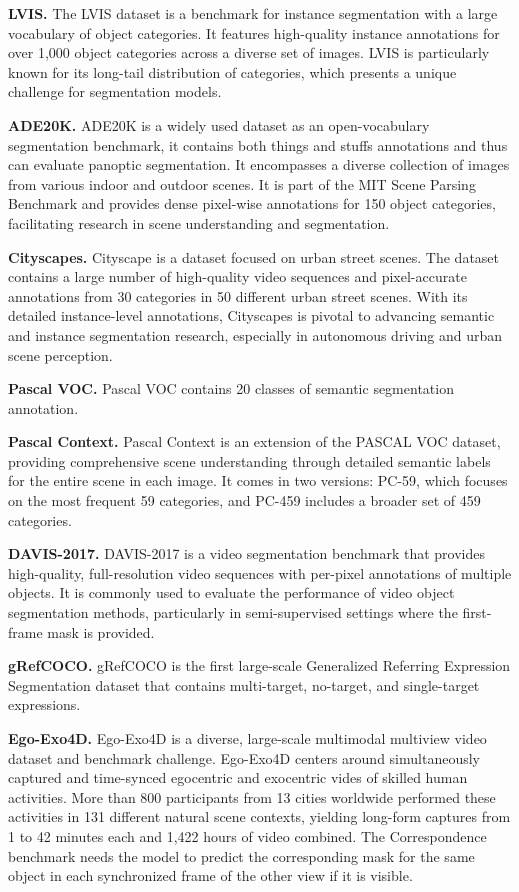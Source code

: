 \noindent\textbf{LVIS.} The LVIS dataset is a benchmark for instance segmentation with a large vocabulary of object categories. It features high-quality instance annotations for over 1,000 object categories across a diverse set of images. LVIS is particularly known for its long-tail distribution of categories, which presents a unique challenge for segmentation models.

\noindent\textbf{ADE20K.} ADE20K is a widely used dataset as an open-vocabulary segmentation benchmark, it contains both things and stuffs annotations and thus can evaluate panoptic segmentation. It encompasses a diverse collection of images from various indoor and outdoor scenes. It is part of the MIT Scene Parsing Benchmark and provides dense pixel-wise annotations for 150 object categories, facilitating research in scene understanding and segmentation.

\noindent\textbf{Cityscapes.} 
Cityscape is a dataset focused on urban street scenes. The dataset contains a large number of high-quality video sequences and pixel-accurate annotations from 30 categories in 50 different urban street scenes. With its detailed instance-level annotations, Cityscapes is pivotal to advancing semantic and instance segmentation research, especially in autonomous driving and urban scene perception.

\noindent\textbf{Pascal VOC.} Pascal VOC contains 20 classes of semantic segmentation annotation.

\noindent\textbf{Pascal Context.} Pascal Context is an extension of the PASCAL VOC dataset, providing comprehensive scene understanding through detailed semantic labels for the entire scene in each image. It comes in two versions: PC-59, which focuses on the most frequent 59 categories, and PC-459 includes a broader set of 459 categories.

\noindent\textbf{DAVIS-2017.} DAVIS-2017 is a video segmentation benchmark that provides high-quality, full-resolution video sequences with per-pixel annotations of multiple objects. It is commonly used to evaluate the performance of video object segmentation methods, particularly in semi-supervised settings where the first-frame mask is provided.

\noindent\textbf{gRefCOCO.} gRefCOCO is the first large-scale Generalized Referring Expression Segmentation dataset that contains multi-target, no-target, and single-target expressions. 

\noindent\textbf{Ego-Exo4D.} Ego-Exo4D is a diverse, large-scale multimodal multiview video dataset and benchmark challenge. Ego-Exo4D centers around simultaneously captured and time-synced egocentric and exocentric vides of skilled human activities. More than 800 participants from 13 cities worldwide performed these activities in 131 different natural scene contexts, yielding long-form captures from 1 to 42 minutes each and 1,422 hours of video combined. The Correspondence benchmark needs the model to predict the corresponding mask for the same object in each synchronized frame of the other view if it is visible.

